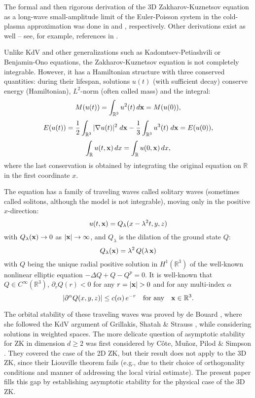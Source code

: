 \documentclass[12pt,letterpaper]{amsart}
\theoremstyle{remark}
\numberwithin{equation}{section}
\numberwithin{theorem}{section}
\numberwithin{table}{section}
\begin{document}
The formal and then rigorous derivation of the 3D Zakharov-Kuznetsov equation as a long-wave small-amplitude limit of the Euler-Poisson system in the cold-plasma approximation  was done in \cite{LS} and \cite{LLS}, respectively. Other derivations exist as well -- see, for example, references in \cite{LLS, FHRY, FHR3}. 

Unlike KdV and other generalizations such as Kadomtsev-Petiashvili or Benjamin-Ono equations, the Zakharov-Kuznetsov equation is not completely integrable. However, it has a Hamiltonian structure with three conserved quantities: during their lifespan, solutions $u(t)$ (with sufficient decay) conserve energy (Hamiltonian), $L^2$-norm (often called mass) and the integral:
\begin{equation}\label{MC}
M(u(t))=\int_{\mathbb{R}^3} u^2(t)\, d {\bf{x}} = M(u(0)),
\end{equation}
\begin{equation}\label{EC}
E(u(t))=\dfrac{1}{2}\int_{\mathbb{R}^3}|\nabla u(t)|^2\;d{\bf{x}} - \dfrac{1}{3}\int_{\mathbb{R}^3} u^{3}(t)\;d{\bf{x}} = E(u(0)),
\end{equation}
\begin{equation}\label{L1-inv}
\int_{\mathbb{R}} u(t,{\bf{x}}) \, dx = \int_{\mathbb{R}} u(0, {\bf{x}}) \, dx,
\end{equation}
where the last conservation is obtained by integrating the original equation on $\mathbb{R}$ in the first coordinate $x$.


The equation has a family of traveling waves called solitary waves (sometimes called solitons, although the model is not integrable), moving only in the positive $x$-direction:
$$
u(t, {\bf{x}}) = Q_\lambda(x - \lambda^2 t, y, z)
$$
with $Q_\lambda({\bf{x}}) \to 0$ as $|{\bf x}| \to \infty$, and $Q_\lambda$ is the dilation of the ground state $Q$:
$$
Q_\lambda({\bf{x}}) = \lambda^2 \, Q(\lambda \, {\bf{x}})
$$
with $Q$ being the unique radial positive solution in $H^1(\mathbb{R}^3)$ of the well-known nonlinear elliptic equation $-\Delta Q+Q  - Q^p = 0$.  It is well-known that $Q \in C^{\infty}(\mathbb{R}^3)$, $\partial_r Q(r) <0$ for any $r = |{\bf{x}}|>0$ and for any multi-index $\alpha$
\begin{equation}\label{prop-Q}
|\partial^\alpha Q(x, y, z)| \leq c(\alpha) \, e^{-r} \quad \mbox{for any}\quad {\bf{x}} \in \mathbb{R}^3.
\end{equation}

The orbital stability of these traveling waves was proved by de Bouard \cite{deB}, where she followed the KdV argument of Grillakis, Shatah \& Strauss \cite{GSS}, while considering solutions in weighted spaces.  The more delicate question of asymptotic stability for ZK in dimension $d\geq 2$ was first considered by C\^{o}te, Mu\~{n}oz, Pilod \& Simpson \cite{CPMS}.  They covered the case of the 2D ZK, but their result does not apply to the 3D ZK, since their Liouville theorem fails (e.g., due to their choice of orthogonality conditions and manner of addressing the local virial estimate).   The present paper fills this gap by establishing asymptotic stability for the physical case of the 3D ZK.
\end{document}
